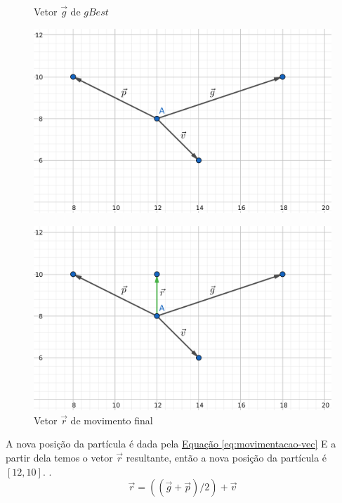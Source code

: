 \begin{figure}[!htb]
\begin{minipage}{\textwidth}
\begin{minipage}{0.48\textwidth}
\centering
\caption{Vetor $\vec g$ de $gBest$}
\label{fig:vetor-g}
\includegraphics[width=.9\linewidth]{assets/vec3.png}
\end{minipage}
\begin{minipage}{0.48\textwidth}
\centering
\caption{Vetor $\vec r$ de movimento final}
\label{fig:vetor-r}
\includegraphics[width=.9\linewidth]{assets/vec4.png}
\end{minipage}

\end{minipage}
\end{figure}

A nova posição da partícula é dada pela 
\hyperref[eq:movimentacao-vec]{Equação \ref{eq:movimentacao-vec}} 
E a partir dela temos o vetor $\vec r$ resultante, então a nova posição da partícula é $[12,10]$.
.
%
\begin{equation} 
    \label{eq:movimentacao-vec}
    \vec r = ((\vec g + \vec p) / 2) + \vec v
\end{equation}

